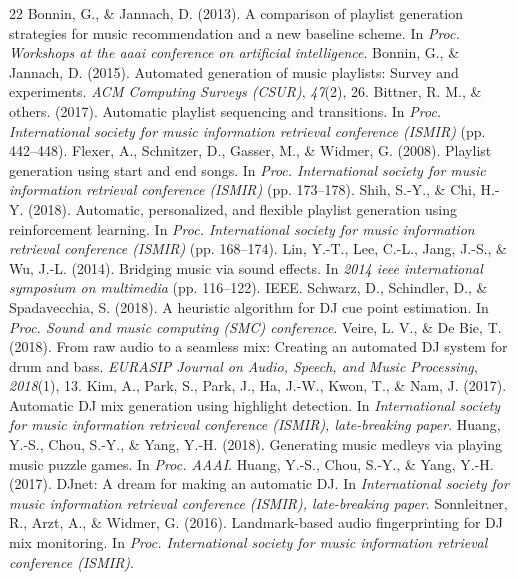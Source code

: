 \documentclass[sigconf]{nimeart}
\begin{document}
\begin{thebibliography}{22}
 {{ }}  Bonnin, G., \& Jannach, D. (2013). A comparison of playlist generation strategies for music recommendation and a new baseline scheme. In \emph{Proc. Workshops at the aaai conference on artificial intelligence}.{}
 {{ }}  Bonnin, G., \& Jannach, D. (2015). Automated generation of music playlists: Survey and experiments. \emph{ACM Computing Surveys (CSUR)}, \emph{47}(2), 26.{}
 {{ }}  Bittner, R. M., \& others. (2017). Automatic playlist sequencing and transitions. In \emph{Proc. International society for music information retrieval conference (ISMIR)} (pp. 442--448).{}
 {{ }}  Flexer, A., Schnitzer, D., Gasser, M., \& Widmer, G. (2008). Playlist generation using start and end songs. In \emph{Proc. International society for music information retrieval conference (ISMIR)} (pp. 173--178).{}
 {{ }}  Shih, S.-Y., \& Chi, H.-Y. (2018). Automatic, personalized, and flexible playlist generation using reinforcement learning. In \emph{Proc. International society for music information retrieval conference (ISMIR)} (pp. 168--174).{}
 {{ }}  Lin, Y.-T., Lee, C.-L., Jang, J.-S., \& Wu, J.-L. (2014). Bridging music via sound effects. In \emph{2014 ieee international symposium on multimedia} (pp. 116--122). IEEE.{}
 {{ }}  Schwarz, D., Schindler, D., \& Spadavecchia, S. (2018). A heuristic algorithm for DJ cue point estimation. In \emph{Proc. Sound and music computing (SMC) conference}.{}
 {{ }}  Veire, L. V., \& De Bie, T. (2018). From raw audio to a seamless mix: Creating an automated DJ system for drum and bass. \emph{EURASIP Journal on Audio, Speech, and Music Processing}, \emph{2018}(1), 13.{}
 {{ }}  Kim, A., Park, S., Park, J., Ha, J.-W., Kwon, T., \& Nam, J. (2017). Automatic DJ mix generation using highlight detection. In \emph{International society for music information retrieval conference (ISMIR), late-breaking paper}.{}
 {{ }}  Huang, Y.-S., Chou, S.-Y., \& Yang, Y.-H. (2018). Generating music medleys via playing music puzzle games. In \emph{Proc. AAAI}.{}
 {{ }}  Huang, Y.-S., Chou, S.-Y., \& Yang, Y.-H. (2017). DJnet: A dream for making an automatic DJ. In \emph{International society for music information retrieval conference (ISMIR), late-breaking paper}.{}
 {{ }}  Sonnleitner, R., Arzt, A., \& Widmer, G. (2016). Landmark-based audio fingerprinting for DJ mix monitoring. In \emph{Proc. International society for music information retrieval conference (ISMIR)}.{}

\end{thebibliography}
\end{document}
